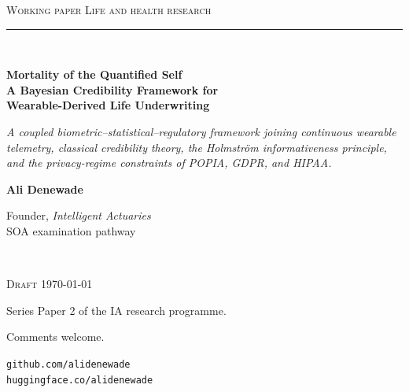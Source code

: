 \documentclass[11pt,a4paper]{article}
\theoremstyle{ia}
\newcommand{\1}{\mathbf{1}}
\begin{document}
\begin{titlepage}
\thispagestyle{empty}
\vspace*{2.6cm}

\noindent
{\sffamily\footnotesize\color{iaaccent}\textsc{Working paper \textbar{} Life and health research}}\\[0.45cm]

{\color{iaaccent}\rule{2.2cm}{1.2pt}}\\[0.85cm]

\noindent
{\sffamily\bfseries\LARGE\color{iadark}%
Mortality of the Quantified Self\\[6pt]
A Bayesian Credibility Framework for\\[6pt]
Wearable-Derived Life Underwriting \par}

\vspace{1.0cm}

\noindent
{\rmfamily\itshape\large\color{iagrey}%
A coupled biometric--statistical--regulatory framework joining
continuous wearable telemetry, classical credibility theory, the
Holmstr\"om informativeness principle, and the privacy-regime
constraints of POPIA, GDPR, and HIPAA. \par}

\vspace{1.8cm}

\noindent
{\sffamily\large\color{iadark}\textbf{Ali Denewade}\par}
\vspace{0.25cm}
\noindent
{\sffamily\footnotesize\color{iagrey}%
Founder, \emph{Intelligent Actuaries}\\
SOA examination pathway\par}

\vfill

\noindent{\color{iarule}\rule{\textwidth}{0.4pt}}\\[8pt]
\noindent
\begin{minipage}[t]{0.55\textwidth}
  {\sffamily\footnotesize\color{iagrey}%
  \textsc{Draft} \textbar{} \today\par
  \vspace{2pt}
  Series Paper 2 of the IA research programme.\par
  Comments welcome.\par}
\end{minipage}\hfill
\begin{minipage}[t]{0.40\textwidth}\raggedleft
  {\sffamily\footnotesize\color{iagrey}%
  \texttt{github.com/alidenewade}\\
  \texttt{huggingface.co/alidenewade}\par}
\end{minipage}

\end{titlepage}
\end{document}
